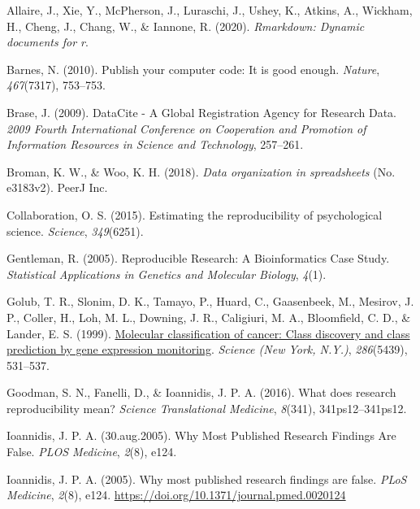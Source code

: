 \documentclass[
  a4paper,
]{article}
\newlength{\cslhangindent}
\newenvironment{CSLReferences}[2] %
 {\begin{list}{}{%
  \setlength{\itemindent}{0pt}
  \setlength{\leftmargin}{0pt}
  \setlength{\parsep}{0pt}
  \ifodd #1
   \setlength{\leftmargin}{\cslhangindent}
   \setlength{\itemindent}{-1\cslhangindent}
  \fi
  \setlength{\itemsep}{#2\baselineskip}}}
 {\end{list}}
\begin{document}
\label{refs}
\begin{CSLReferences}{1}{0}
Allaire, J., Xie, Y., McPherson, J., Luraschi, J., Ushey, K., Atkins,
A., Wickham, H., Cheng, J., Chang, W., \& Iannone, R. (2020).
\emph{Rmarkdown: {Dynamic} documents for r}.

Barnes, N. (2010). Publish your computer code: It is good enough.
\emph{Nature}, \emph{467}(7317), 753--753.

Brase, J. (2009). {DataCite} - {A Global Registration Agency} for
{Research Data}. \emph{2009 {Fourth International Conference} on
{Cooperation} and {Promotion} of {Information Resources} in {Science}
and {Technology}}, 257--261.

Broman, K. W., \& Woo, K. H. (2018). \emph{Data organization in
spreadsheets} (No. e3183v2). PeerJ Inc.

Collaboration, O. S. (2015). Estimating the reproducibility of
psychological science. \emph{Science}, \emph{349}(6251).

Gentleman, R. (2005). Reproducible {Research}: {A Bioinformatics Case
Study}. \emph{Statistical Applications in Genetics and Molecular
Biology}, \emph{4}(1).

Golub, T. R., Slonim, D. K., Tamayo, P., Huard, C., Gaasenbeek, M.,
Mesirov, J. P., Coller, H., Loh, M. L., Downing, J. R., Caligiuri, M.
A., Bloomfield, C. D., \& Lander, E. S. (1999).
\href{https://www.ncbi.nlm.nih.gov/pubmed/10521349}{Molecular
classification of cancer: Class discovery and class prediction by gene
expression monitoring}. \emph{Science (New York, N.Y.)},
\emph{286}(5439), 531--537.

Goodman, S. N., Fanelli, D., \& Ioannidis, J. P. A. (2016). What does
research reproducibility mean? \emph{Science Translational Medicine},
\emph{8}(341), 341ps12--341ps12.

Ioannidis, J. P. A. (30.aug.2005). Why {Most Published Research Findings
Are False}. \emph{PLOS Medicine}, \emph{2}(8), e124.

Ioannidis, J. P. A. (2005). Why most published research findings are
false. \emph{PLoS Medicine}, \emph{2}(8), e124.
\url{https://doi.org/10.1371/journal.pmed.0020124}


\end{CSLReferences}
\end{document}
